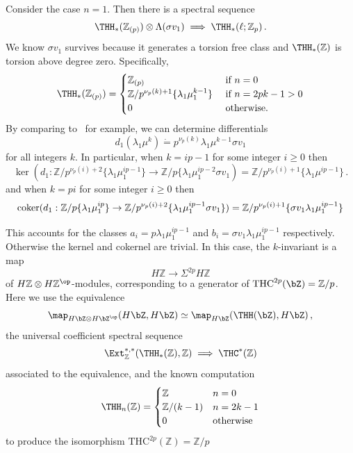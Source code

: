 \begin{example}
Consider the case $n=1$. Then there is a spectral sequence 
\[ 
\THH_{*}(\mathbb{Z}_{(p)})\otimes \Lambda (\sigma v_{1})\implies \THH_{*}(\ell;\mathbb{Z}_{p}) \,.
\]
We know $\sigma v_1$ survives because it generates a torsion free class and $\THH_*(\mathbb{Z})$ is torsion above degree zero. Specifically, 
\[
\THH_*(\mathbb{Z}_{(p)})=\begin{cases} \mathbb{Z}_{(p)} & \text{ if } n=0 \\ 
\mathbb{Z}/p^{\nu_p(k)+1}\{\lambda_1\mu_1^{k-1}\} & \text{ if } n=2pk-1>0 \\ 
0 & \text{ otherwise.}
\end{cases}
\]
By comparing to~\cite{AHL10} for example, we can determine differentials 
\[
d_1(\lambda_1\mu^{k})\dot{=}p^{\nu_p(k)}\lambda_1\mu^{k-1}\sigma v_1 
\]
for all integers $k$. 
In particular, when $k=ip-1$ for some integer $i\ge 0$ then 
\[ 
\ker
(d_1 :\mathbb{Z}/p^{\nu_p(i)+2}\{\lambda_1\mu_1^{ip-1}\}\to \mathbb{Z}/p\{\lambda_1\mu_1^{ip-2}\sigma v_1) = \mathbb{Z}/p^{\nu_p(i)+1}\{\lambda_1\mu^{ip-1}\} \,.
\]
and when $k=pi$ for some integer $i\ge 0$ then 
\[ 
\textup{coker} 
(d_1 :\mathbb{Z}/p\{\lambda_1\mu_1^{ip}\}\to \mathbb{Z}/p^{\nu_p(i)+2}\{\lambda_1 \mu_1^{ip-1}\sigma v_1 \}) = \mathbb{Z}/p^{\nu_p(i)+1}\{\sigma v_1\lambda_1\mu_1^{ip-1}\}
\]

This accounts for the classes $a_i=p\lambda_1\mu_1^{ip-1}$ and $b_i=\sigma v_1\lambda_1\mu_1^{ip-1}$ respectively. Otherwise the kernel and cokernel are trivial. In this case, the $k$-invariant is a map 
\[ H\mathbb{Z}\to \Sigma^{2p} H\mathbb{Z}\]
of $ H\mathbb{Z}\otimes H\mathbb{Z}^{\op}$-modules, corresponding to a generator of $\mathrm{THC}^{2p}(\bZ)=\mathbb{Z}/p$. Here we use the equivalence 
\[ 
\map_{H\bZ\otimes H\bZ^{\op}}(H\bZ,H\bZ)\simeq \map_{H\bZ}(\THH(\bZ),H\bZ) \,,
\]
the universal coefficient spectral sequence 
\[ 
\Ext_{\mathbb{Z}}^{*,*}(\THH_*(\mathbb{Z}),\mathbb{Z})\implies \THC^*(\mathbb{Z})
\]
associated to the equivalence, and the known computation 
\[
    \THH_n(\mathbb{Z})=\begin{cases} \mathbb{Z} &n=0 \\ 
    \mathbb{Z}/(k-1) &n=2k-1 \\ 
    0 & \text{otherwise}
    \end{cases}
\]
to produce the isomorphism $\mathrm{THC}^{2p}(\mathbb{Z})=\mathbb{Z}/p$
\end{example}
